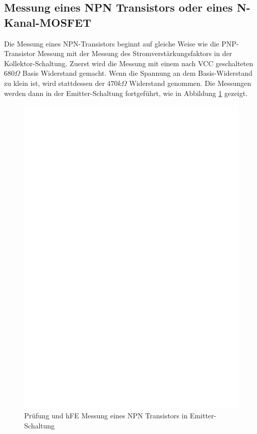 \subsection{Messung eines NPN Transistors oder eines N-Kanal-MOSFET}
Die Messung eines NPN-Transistors beginnt auf gleiche Weise wie die PNP-Transistor Messung
mit der Messung des Stromverst\"arkungsfaktors in der Kollektor-Schaltung.
Zuerst wird die Messung mit einem nach VCC geschalteten \(680\Omega\) Basis Widerstand gemacht.
Wenn die Spannung an dem Basis-Widerstand zu klein ist, wird stattdessen der \(470k\Omega\) Widerstand genommen.
Die Messungen werden dann in der Emitter-Schaltung fortgef\"uhrt, wie in Abbildung \ref{fig:npnce} gezeigt.
\begin{figure}[H]
\centering
\includegraphics[]{../FIG/NPNce.eps}
\caption{Pr\"ufung und hFE Messung eines NPN Transistors in Emitter-Schaltung}
\label{fig:npnce}
\end{figure}
